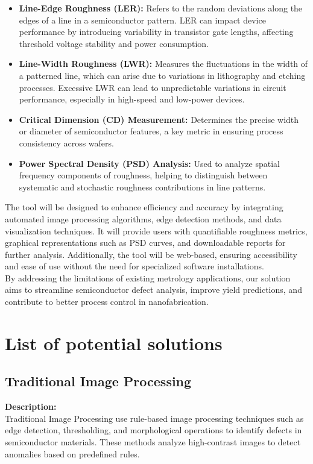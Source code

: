 \documentclass[12pt,oneside,letterpaper,english]{article}
\begin{document}
\begin{itemize}
	\item \textbf{Line-Edge Roughness (LER):} Refers to the random deviations along the edges of a line in a semiconductor pattern. LER can impact device performance by introducing variability in transistor gate lengths, affecting threshold voltage stability and power consumption.
	
	\item \textbf{Line-Width Roughness (LWR):} Measures the fluctuations in the width of a patterned line, which can arise due to variations in lithography and etching processes. Excessive LWR can lead to unpredictable variations in circuit performance, especially in high-speed and low-power devices.  
	
	\item \textbf{Critical Dimension (CD) Measurement:} Determines the precise width or diameter of semiconductor features, a key metric in ensuring process consistency across wafers.
	
	\item \textbf{Power Spectral Density (PSD) Analysis:} Used to analyze spatial frequency components of roughness, helping to distinguish between systematic and stochastic roughness contributions in line patterns.
	
\end{itemize}
The tool will be designed to enhance efficiency and accuracy by integrating automated image processing algorithms, edge detection methods, and data visualization techniques. It will provide users with quantifiable roughness metrics, graphical representations such as PSD curves, and downloadable reports for further analysis. Additionally, the tool will be web-based, ensuring accessibility and ease of use without the need for specialized software installations.  \\

By addressing the limitations of existing metrology applications, our solution aims to streamline semiconductor defect analysis, improve yield predictions, and contribute to better process control in nanofabrication.\\

\section{List of potential solutions}
\subsection{Traditional Image Processing}
\textbf{Description:}\\
Traditional Image Processing use rule-based image processing techniques such as edge detection, thresholding, and morphological operations to identify defects in semiconductor materials. These methods analyze high-contrast images to detect anomalies based on predefined rules.\\
\end{document}
